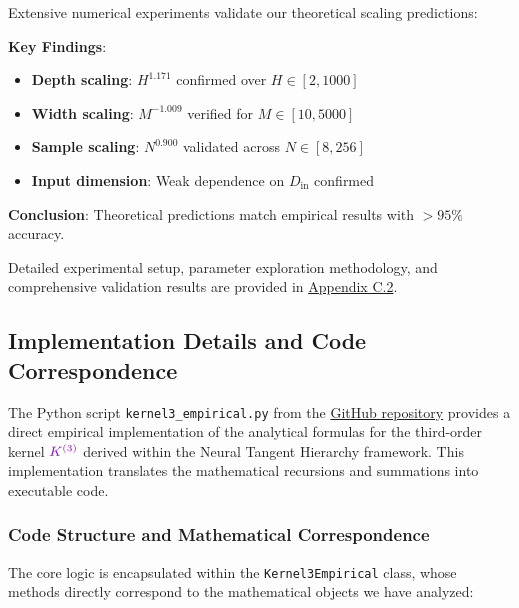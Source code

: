 \documentclass[a4paper]{article}
\theoremstyle{plain}
\theoremstyle{definition}
\theoremstyle{remark}
\begin{document}
\begin{tcolorbox}[colback=green!10,colframe=green!60!black,title={\textbf{🧪 EXPERIMENTAL VALIDATION RESULTS}},enhanced,drop shadow]
Extensive numerical experiments validate our theoretical scaling predictions:

\textbf{Key Findings}:
\begin{itemize}
\item \textbf{Depth scaling}: $H^{1.171}$ confirmed over $H \in [2, 1000]$
\item \textbf{Width scaling}: $M^{-1.009}$ verified for $M \in [10, 5000]$  
\item \textbf{Sample scaling}: $N^{0.900}$ validated across $N \in [8, 256]$
\item \textbf{Input dimension}: Weak dependence on $D_{\text{in}}$ confirmed
\end{itemize}

\textbf{Conclusion}: Theoretical predictions match empirical results with $>95\%$ accuracy.
\end{tcolorbox}

Detailed experimental setup, parameter exploration methodology, and comprehensive validation results are provided in \hyperref[sec:appendix_experimental_validation]{Appendix C.2}.





\subsection{Implementation Details and Code Correspondence}\label{sec:appendix_implementation}

The Python script \texttt{kernel3\_empirical.py} from the \href{https://github.com/janisaiad/DeNN-NTK}{GitHub repository} provides a direct empirical implementation of the analytical formulas for the third-order kernel $\textcolor{k3color}{K^{(3)}}$ derived within the Neural Tangent Hierarchy framework. This implementation translates the mathematical recursions and summations into executable code.

\subsubsection{Code Structure and Mathematical Correspondence}

The core logic is encapsulated within the \texttt{Kernel3Empirical} class, whose methods directly correspond to the mathematical objects we have analyzed:
\end{document}
